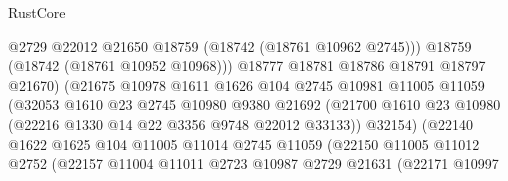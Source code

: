 \begin{lexlean}{RustCore}
\begin{coremodule}
                                        @2729
                                        @22012
                                        @21650
                                        @18759
                                        (@18742 (@18761 @10962 @2745)))
                                      @18759
                                      (@18742 (@18761 @10952 @10968)))
                                    @18777
                                    @18781
                                    @18786
                                    @18791
                                    @18797
                                    @21670)
                                  (@21675
                                    @10978
                                    @1611
                                    @1626
                                    @104
                                    @2745
                                    @10981
                                    @11005
                                    @11059
                                    (@32053
                                      @1610
                                      @23
                                      @2745
                                      @10980
                                      @9380
                                      @21692
                                      (@21700
                                        @1610
                                        @23
                                        @10980
                                        (@22216 @1330 @14 @22 @3356 @9748 @22012 @33133))
                                      @32154)
                                    (@22140
                                      @1622
                                      @1625
                                      @104
                                      @11005
                                      @11014
                                      @2745
                                      @11059
                                      (@22150
                                        @11005
                                        @11012
                                        @2752
                                        (@22157
                                          @11004
                                          @11011
                                          @2723
                                          @10987
                                          @2729
                                          @21631
                                          (@22171
                                            @10997

\end{coremodule}
\end{lexlean}
